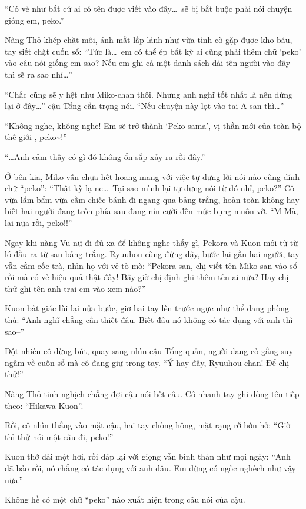 \documentclass[../main.tex]{subfiles}
\begin{document}
``Có vẻ như bất cứ ai có tên được viết vào đây\dots\ sẽ bị bắt buộc phải nói chuyện giống em, peko.''

Nàng Thỏ khép chặt môi, ánh mắt lấp lánh như vừa tình cờ gặp được kho báu, tay siết chặt cuốn sổ: ``Tức là\dots\ em có thể ép bất kỳ ai cũng phải thêm chữ `peko' vào câu nói giống em sao? Nếu em ghi cả một danh sách dài tên người vào đây thì sẽ ra sao nhỉ\dots''

``Chắc cũng sẽ y hệt như Miko-chan thôi. Nhưng anh nghĩ tốt nhất là nên dừng lại ở đây\dots'' cậu Tổng cẩn trọng nói. ``Nếu chuyện này lọt vào tai A-san thì\dots''

``Không nghe, không nghe! Em sẽ trở thành `Peko-sama', vị thần mới của toàn bộ thế giới \hll, peko\~{}!''

``\dots Anh cảm thấy có gì đó không ổn sắp xảy ra rồi đây.''

Ở bên kia, Miko vẫn chưa hết hoang mang với việc tự dưng lời nói nào cũng dính chữ ``peko'': ``Thật kỳ lạ ne\dots\ Tại sao mình lại tự dưng nói từ đó nhỉ, peko?'' Cô vừa lẩm bẩm vừa cầm chiếc bánh đi ngang qua bảng trắng, hoàn toàn không hay biết hai người đang trốn phía sau đang nín cười đến mức bụng muốn vỡ. ``M-Mà, lại nữa rồi, peko!!''

Ngay khi nàng Vu nữ đi đủ xa để không nghe thấy gì, Pekora và Kuon mới từ từ ló đầu ra từ sau bảng trắng. Ryuuhou cũng đứng dậy, bước lại gần hai người, tay vẫn cầm cốc trà, nhìn họ với vẻ tò mò: ``Pekora-san, chị viết tên Miko-san vào sổ rồi mà có vẻ hiệu quả thật đấy! Bây giờ chị định ghi thêm tên ai nữa? Hay chị thử ghi tên anh trai em vào xem nào?''

Kuon bất giác lùi lại nửa bước, giơ hai tay lên trước ngực như thể đang phòng thủ: ``Anh nghĩ chẳng cần thiết đâu. Biết đâu nó không có tác dụng với anh thì sao--''

Đột nhiên cô dừng bút, quay sang nhìn cậu Tổng quản, người đang cố gắng suy ngẫm về cuốn sổ mà cô đang giữ trong tay. ``Ý hay đấy, Ryuuhou-chan! Để chị thử!''

Nàng Thỏ tinh nghịch chẳng đợi cậu nói hết câu. Cô nhanh tay ghi dòng tên tiếp theo: ``Hikawa Kuon''.

Rồi, cô nhìn thẳng vào mặt cậu, hai tay chống hông, mặt rạng rỡ hớn hở: ``Giờ thì thử nói một câu đi, peko!''

Kuon thở dài một hơi, rồi đáp lại với giọng vẫn bình thản như mọi ngày: ``Anh đã bảo rồi, nó chẳng có tác dụng với anh đâu. Em đừng có ngốc nghếch như vậy nữa.''

Không hề có một chữ ``peko'' nào xuất hiện trong câu nói của cậu.
\end{document}
